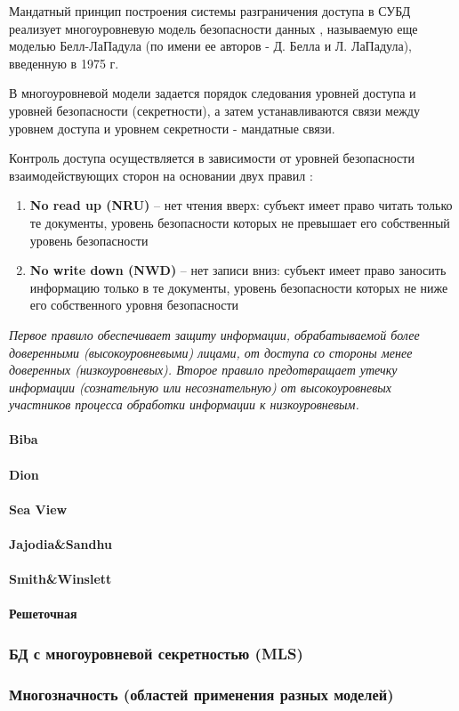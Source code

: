 Мандатный принцип построения системы разграничения доступа в СУБД реализует многоуровневую модель безопасности 
данных \autocite{Skakun}, называемую еще моделью Белл-ЛаПадула (по имени ее авторов - Д. Белла и Л. ЛаПадула), 
введенную в 1975 г.

В многоуровневой модели задается порядок следования уровней доступа и уровней безопасности (секретности), 
а затем устанавливаются связи между уровнем доступа и уровнем секретности - мандатные связи.

Контроль доступа осуществляется в зависимости от уровней безопасности взаимодействующих сторон на 
основании двух правил \autocite{URFULecture10Models}:
\begin{enumerate}
    \item \textbf{No read up (NRU)} – нет чтения вверх: субъект имеет право читать только те документы, 
    уровень безопасности которых не превышает его собственный уровень безопасности

    \item \textbf{No write down (NWD)} – нет записи вниз: субъект имеет право заносить информацию только 
    в те документы, уровень безопасности которых не ниже его собственного уровня безопасности
\end{enumerate}

\textit{Первое правило обеспечивает защиту информации, обрабатываемой более доверенными 
(высокоуровневыми) лицами, от доступа со стороны менее доверенных (низкоуровневых). Второе правило 
предотвращает утечку информации (сознательную или несознательную) от высокоуровневых участников 
процесса обработки информации к низкоуровневым.}

\paragraph{Biba}

\paragraph{Dion}
\paragraph{Sea View}
\paragraph{Jajodia\&Sandhu}
\paragraph{Smith\&Winslett}
\paragraph{Решеточная}

\subsubsection{БД с многоуровневой секретностью (MLS)}
\subsubsection{Многозначность (областей применения разных моделей)}